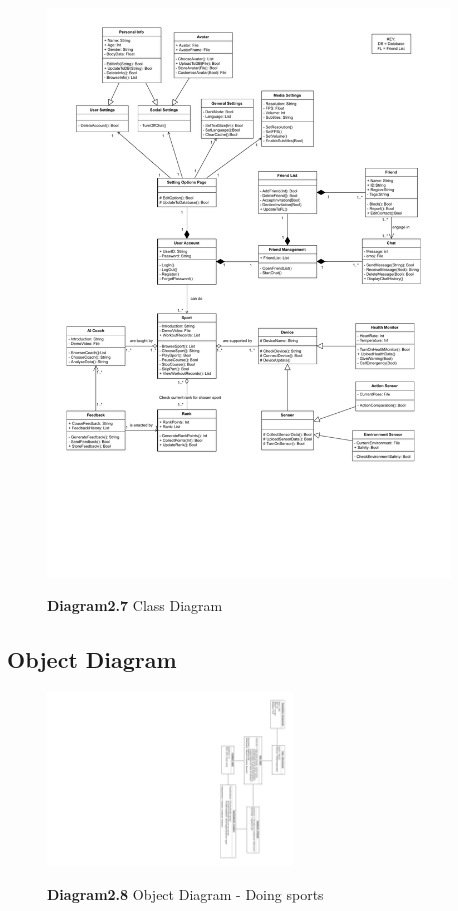 \documentclass[a4paper]{article}
\begin{document}
	\begin{figure}[H]
		\centering
		\caption*{\textbf{Diagram2.7} Class Diagram}
		\includegraphics[width=0.95\textwidth]{images/ClassDiagram.pdf}
		\label{CD}
	\end{figure}
	\newpage

	\subsection{Object Diagram}

	\begin{figure}[H]
		\centering
		\caption*{\textbf{Diagram2.8} Object Diagram - Doing sports}
		\includegraphics[width = 0.58\textwidth]{images/ObjectDiagram.pdf}
		\label{OD_Sport}
	\end{figure}
\end{document}
